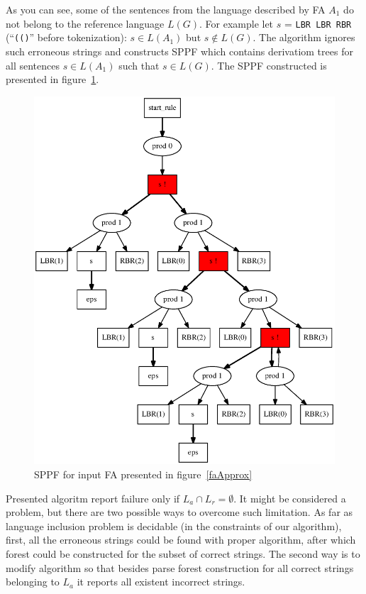 As you can see, some of the sentences from the language described by FA $A_1$ do not belong to the reference language $L(G)$.
For example let $s$ = \verb|LBR LBR RBR| (``\verb|(()|'' before tokenization): $s \in L(A_1)$ but $s \notin L(G)$.
The algorithm ignores such erroneous strings and constructs SPPF which contains derivatiom trees for all sentences $s \in L(A_1)$ such that $s \in L(G)$.
The SPPF constructed is presented in figure~\ref{resultSPPF}.
\begin{figure}
    \begin{center}
        \includegraphics[scale=0.3]{dot/out3.eps}
    \end{center}
    \caption{SPPF for input FA presented in figure~\ref{faApprox}}
    \label{resultSPPF}
\end{figure}

Presented algoritm report failure only if $L_a \cap L_r = \emptyset$. It might be considered a problem, but there are two possible ways to overcome such limitation. 
As far as language inclusion problem is decidable (in the constraints of our algorithm), first, all the erroneous strings could be found with proper algorithm, 
after which forest could be constructed for the subset of correct strings. 
The second way is to modify algorithm so that besides parse forest construction for all correct strings belonging to $L_a$ 
it reports all existent incorrect strings.

